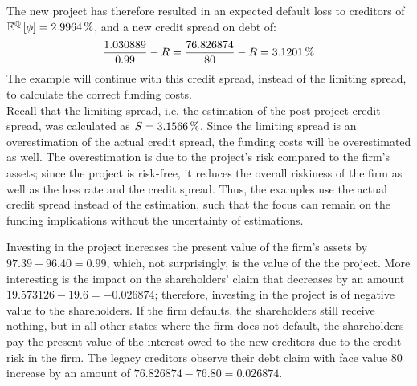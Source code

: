 \documentclass[main.tex]{subfiles}
\begin{document}
        The new project has therefore resulted in an expected default loss to creditors of 
        $\mathbb{E}^{\rnmeasure}\left[\phi\right] = \pct{0.029964}$,
        and a new credit spread on debt of:
        \begin{equation*}
            \frac{
                1.030889
            }{    
                0.99
            } 
            -
            R
            = 
            \frac{
                76.826874
            }{    
                80
            } 
            -
            R
            =
            \pct{0.031201}
        \end{equation*}
        The example will continue with this credit spread, instead of the limiting spread,
        to calculate the correct funding costs.
        \\
        Recall that the limiting spread, i.e. the estimation of the post-project credit spread, 
        was calculated as $S = \pct{0.031566}$.
        Since the limiting spread is an overestimation of the actual credit spread,
        the funding costs will be overestimated as well.
        The overestimation is due to the project's risk compared to the firm's assets;
        since the project is risk-free, it reduces the overall riskiness of the firm
        as well as the loss rate and the credit spread.
        Thus, the examples use the actual credit spread instead of the estimation, 
        such that the focus can remain on the funding implications
        without the uncertainty of estimations.

        Investing in the project increases the present value of the firm's assets by $\num{97.39} - \num{96.40} = \num{0.99}$, 
        which, not surprisingly, is the value of the the project.
        More interesting is the impact on the shareholders' claim that decreases by an amount $\num{19.573126} - \num{19.6} = \num{-0.026874}$; 
        therefore, investing in the project is of negative value to the shareholders.
        If the firm defaults, the shareholders still receive nothing, 
        but in all other states where the firm does not default, 
        the shareholders pay the present value of the interest owed to the new creditors 
        due to the credit risk in the firm.
        The legacy creditors observe their debt claim with face value $\num{80}$ increase by an amount of
        $\num{76.826874} - \num{76.80} = \num{0.026874}$.
\end{document}
